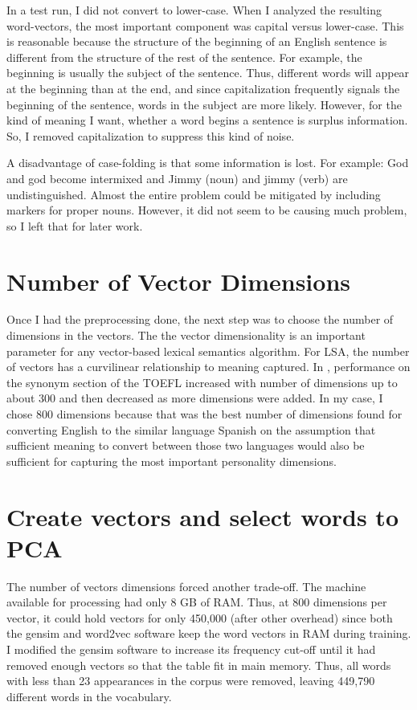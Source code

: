 In a test run, I did not convert to lower-case. When I analyzed the resulting 
word-vectors, the most important component was capital versus lower-case. This 
is reasonable because the structure of the beginning of an English sentence is 
different from the structure of the rest of the sentence. For example, the 
beginning is usually the subject of the sentence. Thus, different words will 
appear at the beginning than at the end, and since capitalization frequently 
signals the beginning of the sentence, words in the subject are more likely. 
However, for the kind of meaning I want, whether a word begins a sentence is 
surplus information. So, I removed capitalization to suppress this kind of 
noise.

A disadvantage of case-folding is that some information is lost. For example: 
God and god become intermixed and Jimmy (noun) and jimmy (verb) are 
undistinguished. Almost the entire problem could be mitigated by including 
markers for proper nouns. However, it did not seem to be causing much problem, 
so I left that for later work.

\section{Number of Vector Dimensions}

Once I had the preprocessing done, the next step was to choose the number of 
dimensions in the vectors. The the vector dimensionality is an important 
parameter for any vector-based lexical semantics algorithm. For LSA, the number 
of vectors has a curvilinear relationship to meaning captured. In \citep[p. 
220]{Landauer1997}, performance on the synonym section of the TOEFL \citep{ETS} 
increased with number of dimensions up to about 300 and then decreased as more 
dimensions were added. In my case, I chose 800 dimensions because that was the 
best number of dimensions found for converting English to the similar language 
Spanish \citep{Mikolov2013a} on the assumption that sufficient meaning to convert 
between those two languages would also be sufficient for capturing the most 
important personality dimensions.

\section{Create vectors and select words to PCA}

The number of vectors dimensions forced another trade-off. The machine available
for processing had only 8 GB of RAM. Thus, at 800 dimensions per vector, it 
could hold vectors for only 450,000 (after other overhead) since both the 
gensim and word2vec software keep the word vectors in RAM during training. 
I modified the gensim software to increase its frequency cut-off until it had removed enough
vectors so that the table fit in main memory. Thus, all words with less than 
23 appearances in the corpus were removed, leaving 449,790 different words in
the vocabulary.

